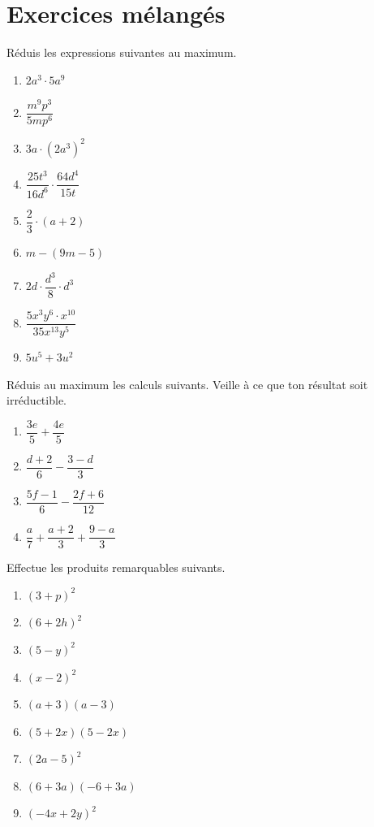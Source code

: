 \documentclass[../math2.tex]{subfiles}
\begin{document}
\newpage
\section{Exercices mélangés}

\begin{exercise}
  Réduis les expressions suivantes au maximum.
  \begin{enumerate}[cols=3]
    \item $2a^3\cdot5a^9$
    \item $\dfrac{m^9p^3}{5mp^6}$
    \item $3a\cdot \left(2a^3\right)^2$
    \item $\dfrac{25t^3}{16d^6}\cdot \dfrac{64d^4}{15t}$
    \item $\dfrac{2}{3}\cdot\left(a+2\right)$
    \item $m-\left(9m-5\right)$
    \item $2d\cdot \dfrac{d^3}{8}\cdot d^3$
    \item $\dfrac{5x^3y^6\cdot x^{10}}{35x^{13}y^5}$
    \item $5u^5+3u^2$
  \end{enumerate}
\end{exercise}

\begin{exercise}
  Réduis au maximum les calculs suivants. Veille à ce que ton résultat soit irréductible.
  \begin{enumerate}[cols=2]
    \item $\dfrac{3e}{5} + \dfrac{4e}{5}$
    \item $\dfrac{d+2}{6} - \dfrac{3-d}{3}$
    \item $\dfrac{5f - 1 }{6} - \dfrac{2f + 6}{12}$
    \item $\dfrac{a}{7} + \dfrac{a + 2}{3} + \dfrac{9-a}{3} $
  \end{enumerate}
\end{exercise}

\begin{exercise}
  Effectue les produits remarquables suivants.
  \begin{enumerate}[cols=3]
    \item $\left(3+p\right)^2$
    \item $\left(6+2h\right)^2$
    \item $\left(5-y\right)^2$
    \item $\left(x-2\right)^2$
    \item $\left(a+3\right)\left(a-3\right)$
    \item $\left(5+2x\right)\left(5-2x\right)$
    \item $\left(2a-5\right)^2$
    \item $\left(6+3a\right)\left(-6+3a\right)$
    \item $\left(-4x + 2y\right)^2$
  \end{enumerate}
\end{exercise}
\end{document}
